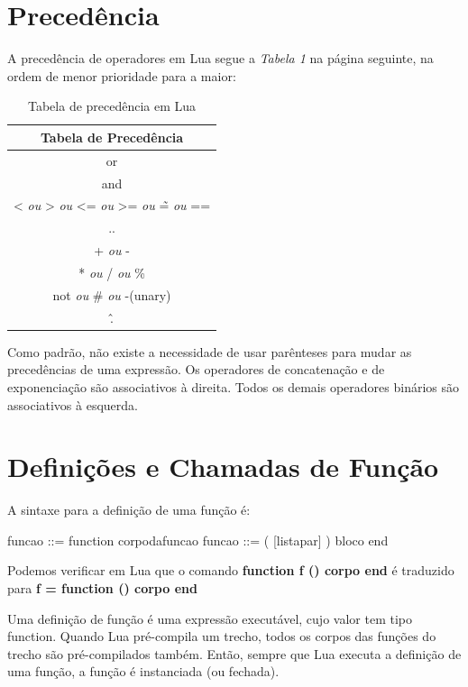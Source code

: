 \documentclass[
12pt, %
openright, %
oneside, %
a4paper, %
english, %
brazil, %
]{abntex2}
\begin{document}
\section{Precedência}
A precedência de operadores em Lua segue a \textit{Tabela 1} na página seguinte, na ordem de menor prioridade para a maior:
\begin{table}
\centering
\begin{tabular}{c|c|c|c|c|c}
\hline
\multicolumn{6}{|c|}{\textbf{Tabela de Precedência}} \\
\hline
\multicolumn{6}{|c|}{or} \\
\hline
\multicolumn{6}{|c|}{and} \\
\hline
\multicolumn{6}{|c|}{< \textit{ou} > \textit{ou} <= \textit{ou} >= \textit{ou} \~= \textit{ou} ==} \\
\hline
\multicolumn{6}{|c|}{..} \\
\hline
\multicolumn{6}{|c|}{+ \textit{ou} -} \\
\hline
\multicolumn{6}{|c|}{* \textit{ou} / \textit{ou} \%} \\
\hline
\multicolumn{6}{|c|}{not \textit{ou} \# \textit{ou} -(unary)} \\
\hline
\multicolumn{6}{|c|}{\^.} \\
\end{tabular}
\label{completa}
\caption{Tabela de precedência em Lua}
\end{table}

Como padrão, não existe a necessidade de usar parênteses para mudar as precedências de uma expressão. Os operadores de concatenação e de exponenciação são associativos à direita. Todos os demais operadores binários são associativos à esquerda.

\section{Definições e Chamadas de Função}
A sintaxe para a definição de uma função é:

  funcao ::= function corpodafuncao
  funcao ::= ( [listapar] ) bloco end

Podemos verificar em Lua que o comando \textbf{function f () corpo end} é traduzido para \textbf{f = function () corpo end}

Uma definição de função é uma expressão executável, cujo valor tem tipo function. Quando Lua pré-compila um trecho, todos os corpos das funções do trecho são pré-compilados também. Então, sempre que Lua executa a definição de uma função, a função é instanciada (ou fechada).
\end{document}
